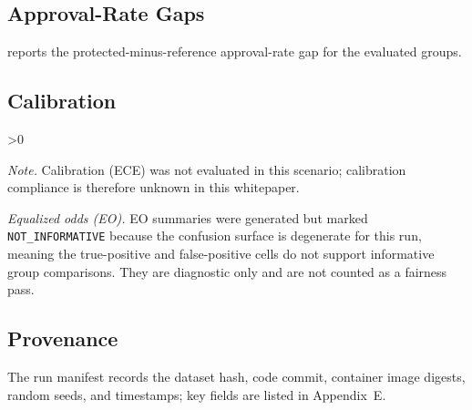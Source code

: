 \FloatBarrier

\subsection{Approval-Rate Gaps}
\noindent {} reports the protected-minus-reference approval-rate gap for the evaluated groups.
\begin{table}[htbp]
\centering

\caption{Approval-rate gaps (SRG) by protected attribute on the amplification (bias-preserving) slice. SRG is defined in \cref{eq:srg} as the protected group selection rate minus the reference group selection rate. Its conservative Wilson-endpoint range is not itself a calibrated 95\% confidence interval; p-values are two-sided under the stated small-sample policy.}
\label{tab:srg_summary}
\end{table}

\FloatBarrier

\subsection{Calibration}
\ifnum\EceEvaluated>0\relax
\begin{table}[htbp]
\centering

\caption{Expected calibration error summary for this run. In this synthetic audit scenario, calibration is not evaluated because no probability scores are available in the intake bundle; calibration compliance is therefore unknown.}
\label{tab:ece_summary}
\end{table}
\else
\noindent\emph{Note.} Calibration (ECE) was not evaluated in this scenario; calibration compliance is therefore unknown in this whitepaper.
\fi

\noindent\emph{Equalized odds (EO).} EO summaries were generated but marked \texttt{NOT\_INFORMATIVE} because the confusion surface is degenerate for this run, meaning the true-positive and false-positive cells do not support informative group comparisons. They are diagnostic only and are not counted as a fairness pass.

\FloatBarrier

\subsection{Provenance}
The run manifest records the dataset hash, code commit, container image digests, random seeds, and timestamps; key fields are listed in Appendix~E.
